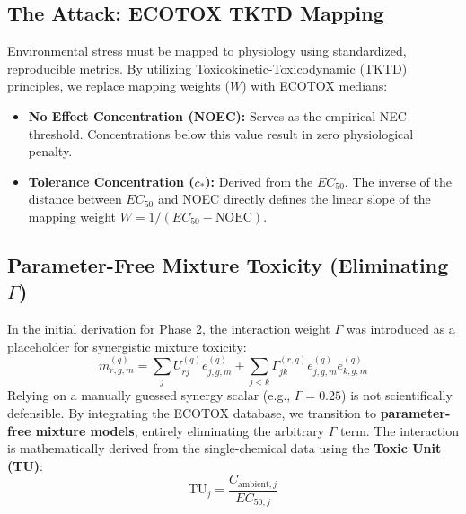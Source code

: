 \documentclass[11pt,a4paper]{article}
\begin{document}
\subsection{The Attack: ECOTOX TKTD Mapping}
Environmental stress must be mapped to physiology using standardized, reproducible metrics. By utilizing Toxicokinetic-Toxicodynamic (TKTD) principles, we replace mapping weights ($W$) with ECOTOX medians:
\begin{itemize}
    \item \textbf{No Effect Concentration (NOEC):} Serves as the empirical NEC threshold. Concentrations below this value result in zero physiological penalty.
    \item \textbf{Tolerance Concentration ($c_*$):} Derived from the $EC_{50}$. The inverse of the distance between $EC_{50}$ and NOEC directly defines the linear slope of the mapping weight $W = 1/(EC_{50} - \text{NOEC})$.
\end{itemize}

\subsection{Parameter-Free Mixture Toxicity (Eliminating $\Gamma$)}

In the initial derivation for Phase 2, the interaction weight $\Gamma$ was introduced as a placeholder for synergistic mixture toxicity:
\begin{equation}
 m_{r, g, m}^{(q)} = \sum_{j} U_{rj}^{(q)} e_{j, g, m}^{(q)} + \sum_{j<k} \Gamma_{jk}^{(r,q)} e_{j,g,m}^{(q)} e_{k,g,m}^{(q)}
\end{equation}
Relying on a manually guessed synergy scalar (e.g., $\Gamma = 0.25$) is not scientifically defensible. By integrating the ECOTOX database, we transition to \textbf{parameter-free mixture models}, entirely eliminating the arbitrary $\Gamma$ term. The interaction is mathematically derived from the single-chemical data using the \textbf{Toxic Unit (TU)}:
\begin{equation}
    \text{TU}_{j} = \frac{C_{\text{ambient}, j}}{EC_{50, j}}
\end{equation}
\end{document}
